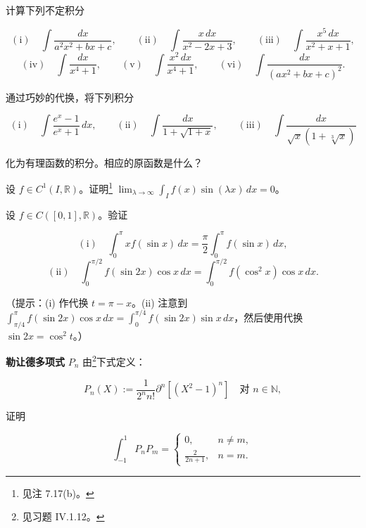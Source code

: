 \begin{exercises}
\item

计算下列不定积分

\[
\mathrm{(i)}\quad \int \frac{dx}{a^2x^2 + bx + c} , \qquad \mathrm{(ii)}\quad \int \frac{x \, dx}{x^2 - 2x + 3} , \qquad \mathrm{(iii)}\quad \int \frac{x^5 \, dx}{x^2 + x + 1} ,
\]
\[
\mathrm{(iv)}\quad \int \frac{dx}{x^4 + 1} , \qquad \mathrm{(v)}\quad \int \frac{x^2 \, dx}{x^4 + 1} , \qquad \mathrm{(vi)}\quad \int \frac{dx}{(ax^2 + bx + c)^2} .
\]
\item

通过巧妙的代换，将下列积分

\[
\mathrm{(i)}\quad \int \frac{e^x - 1}{e^x + 1} \, dx , \qquad \mathrm{(ii)}\quad \int \frac{dx}{1 + \sqrt{1 + x}} , \qquad \mathrm{(iii)}\quad \int \frac{dx}{\sqrt{x} (1 + \sqrt[3]{x})}
\]

化为有理函数的积分。相应的原函数是什么？

\item

设 $ f \in C^1(I, \mathbb{R}) $。证明\footnote{见注 7.17(b)。} $ \lim_{\lambda \to \infty} \int_I f(x) \sin(\lambda x) \, dx = 0 $。

\item

设 $ f \in C([0, 1], \mathbb{R}) $。验证

\[
\mathrm{(i)}\quad \int_{0}^{\pi} x f(\sin x) \, dx = \frac{\pi}{2} \int_{0}^{\pi} f(\sin x) \, dx ,
\]
\[
\mathrm{(ii)}\quad \int_{0}^{\pi/2} f(\sin 2x) \cos x \, dx = \int_{0}^{\pi/2} f(\cos^2 x) \cos x \, dx .
\]

（提示：(i) 作代换 $ t = \pi - x $。(ii) 注意到 $ \int_{\pi/4}^{\pi} f(\sin 2x) \cos x \, dx = \int_{0}^{\pi/4} f(\sin 2x) \sin x \, dx $，然后使用代换 $ \sin 2x = \cos^2 t $。）

\item

\textbf{勒让德多项式} $ P_n $ 由\footnote{见习题 IV.1.12。}下式定义：

\[
P_n(X) := \frac{1}{2^n n!} \partial^n [(X^2 - 1)^n] \quad \text{对 } n \in \mathbb{N} ,
\]

证明

\begin{equation*}
\int_{-1}^{1} P_n P_m = \begin{cases} 0 , & n \ne m , \\ \frac{2}{2n+1} , & n = m . \end{cases}
\end{equation*}
\item


\end{exercises}
